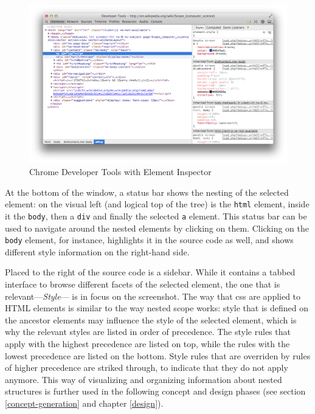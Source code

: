 \begin{figure}[H]
\centering
\includegraphics[keepaspectratio,width=\textwidth,height=0.75\textheight]{img/devtools.png}
\caption{Chrome Developer Tools with Element Inspector}
\label{fig:devtools}
\end{figure}

At the bottom of the window, a status bar shows the nesting of the
selected element: on the visual left (and logical top of the tree) is
the \texttt{html} element, inside it the \texttt{body}, then a
\texttt{div} and finally the selected \texttt{a} element. This status
bar can be used to navigate around the nested elements by clicking on
them. Clicking on the \texttt{body} element, for instance, highlights it
in the source code as well, and shows different style information on the
right-hand side.

Placed to the right of the source code is a sidebar. While it contains a
tabbed interface to browse different facets of the selected element, the
one that is relevant—\emph{Style}— is in focus on the screenshot. The
way that \ac{css} are applied to HTML elements is similar to the way
nested scope works: style that is defined on the ancestor elements may
influence the style of the selected element, which is why the relevant
styles are listed in order of precedence. The style rules that apply
with the highest precedence are listed on top, while the rules with the
lowest precedence are listed on the bottom. Style rules that are
overriden by rules of higher precedence are striked through, to indicate
that they do not apply anymore. This way of visualizing and organizing
information about nested structures is further used in the following
concept and design phases (see section \ref{concept-generation} and
chapter \ref{design}).

